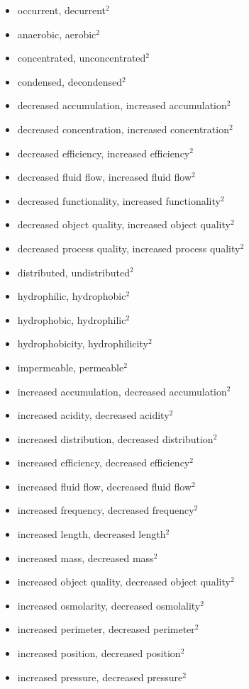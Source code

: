 \begin{itemize}
  \item occurrent, decurrent$^2$
  \item anaerobic, aerobic$^2$
  \item concentrated, unconcentrated$^2$
  \item condensed, decondensed$^2$
  \item decreased accumulation, increased accumulation$^2$
  \item decreased concentration, increased concentration$^2$
  \item decreased efficiency, increased efficiency$^2$
  \item decreased fluid flow, increased fluid flow$^2$
  \item decreased functionality, increased functionality$^2$
  \item decreased object quality, increased object quality$^2$
  \item decreased process quality, increased process quality$^2$
  \item distributed, undistributed$^2$
  \item hydrophilic, hydrophobic$^2$
  \item hydrophobic, hydrophilic$^2$
  \item hydrophobicity, hydrophilicity$^2$
  \item impermeable, permeable$^2$
  \item increased accumulation, decreased accumulation$^2$
  \item increased acidity, decreased acidity$^2$
  \item increased distribution, decreased distribution$^2$
  \item increased efficiency, decreased efficiency$^2$
  \item increased fluid flow, decreased fluid flow$^2$
  \item increased frequency, decreased frequency$^2$
  \item increased length, decreased length$^2$
  \item increased mass, decreased mass$^2$
  \item increased object quality, decreased object quality$^2$
  \item increased osmolarity, decreased osmolality$^2$
  \item increased perimeter, decreased perimeter$^2$
  \item increased position, decreased position$^2$
  \item increased pressure, decreased pressure$^2$

\end{itemize}
